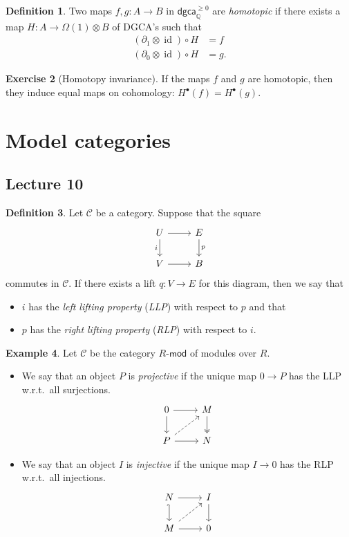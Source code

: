 \documentclass[10pt,letterpaper,cm]{nupset}
\theoremstyle{definition}
\newtheorem{defn}{Definition}[subsection]
\newtheorem{exmp}[defn]{Example}
\theoremstyle{theorem}
\newtheorem{exercise}[defn]{Exercise}
\theoremstyle{remark}
\newcommand{\Q}{\mathbb Q}
\newcommand{\1}{\mathbb{1}}
\renewcommand{\c}{\mathcal{C}}
\newcommand{\dgca}{\mathsf{dgca}}
\newcommand{\0}{\vec 0}
\DeclareMathOperator{\id}{id}
\newcommand{\bi}{\begin{itemize}}
\newcommand{\ei}{\end{itemize}}
\begin{document}
\begin{defn}
Two maps $f,g : A \to B$ in $\dgca_{\Q}^{\geq 0}$ are \textit{homotopic} if there exists a map $H : A \to \Omega(1) \otimes B$ of DGCA's such that
\begin{align*}
\left(\partial_1 \otimes \id\right) \circ H & = f
\\ \left(\partial_0 \otimes \id\right) \circ H & = g.
\end{align*}
\end{defn}

\begin{exercise}[Homotopy invariance]
If the maps $f$ and $g$ are homotopic, then they induce equal maps on cohomology: $H^{\bullet}(f) = H^{\bullet}(g)$.
\end{exercise}

\section{Model categories}

\subsection{Lecture 10}

\begin{defn}
Let $\c$ be a category. Suppose that the square
\[
\begin{tikzcd}
	U & E \\
	V & B
	\arrow["i"', from=1-1, to=2-1]
	\arrow[from=2-1, to=2-2]
	\arrow["p", from=1-2, to=2-2]
	\arrow[from=1-1, to=1-2]
\end{tikzcd}
\] commutes in $\c$. If there exists a lift $q : V \to E$ for this diagram, then we say that
\bi
\item $i$ has the \textit{left lifting property} (\textit{LLP}) with respect to $p$ and that
\item $p$ has the \textit{right lifting property} (\textit{RLP}) with respect to $i$.
\ei
\end{defn}

\begin{exmp}
Let $\c$ be the category $R\text{-}\mathsf{mod}$ of modules over $R$. 
\bi
\item We say that an object $P$ is \textit{projective} if the unique map $0 \to P$ has the LLP w.r.t.\ all surjections.
\[
\begin{tikzcd}
	0 & M \\
	P & N
	\arrow[from=1-1, to=2-1]
	\arrow[from=1-1, to=1-2]
	\arrow[two heads, from=1-2, to=2-2]
	\arrow[from=2-1, to=2-2]
	\arrow[dashed, from=2-1, to=1-2]
\end{tikzcd}
\]
\item We say that an object $I$ is \textit{injective} if the unique map $I \to 0$ has the RLP w.r.t.\ all injections. 
\[
\begin{tikzcd}
	N & I \\
	M & 0
	\arrow[from=1-1, to=1-2]
	\arrow[hook', from=1-1, to=2-1]
	\arrow[from=2-1, to=2-2]
	\arrow[from=1-2, to=2-2]
	\arrow[dashed, from=2-1, to=1-2]
\end{tikzcd}
\]
\ei
\end{exmp}
\end{document}

